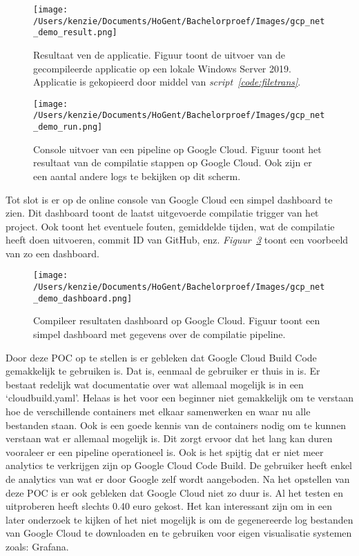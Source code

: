 \begin{figure}[!htbp]
    \centering
    \texttt{[image: /Users/kenzie/Documents/HoGent/Bachelorproef/Images/gcp\_net\_demo\_result.png]}
    \caption{Resultaat ven de applicatie. Figuur toont de uitvoer van de gecompileerde applicatie op een lokale Windows Server 2019. Applicatie is gekopieerd door middel van \emph{script~\ref{code:filetrans}}.}
    \label{fig:GCP_POC_result}
\end{figure}

\begin{figure}[!htbp]
    \centering
    \texttt{[image: /Users/kenzie/Documents/HoGent/Bachelorproef/Images/gcp\_net\_demo\_run.png]}
    \caption{Console uitvoer van een pipeline op Google Cloud. Figuur toont het resultaat van de compilatie stappen op Google Cloud. Ook zijn er een aantal andere logs te bekijken op dit scherm.}
    \label{fig:GCP_POC_run}
\end{figure}

Tot slot is er op de online console van Google Cloud een simpel dashboard te zien. Dit dashboard toont de laatst uitgevoerde compilatie trigger van het project. Ook toont het eventuele fouten, gemiddelde tijden, wat de compilatie heeft doen uitvoeren, commit ID van GitHub, enz. \emph{Figuur~\ref{fig:GCP_POC_dashboard}} toont een voorbeeld van zo een dashboard.

\begin{figure}[!htbp]
    \centering
    \texttt{[image: /Users/kenzie/Documents/HoGent/Bachelorproef/Images/gcp\_net\_demo\_dashboard.png]}
    \caption{Compileer resultaten dashboard op Google Cloud. Figuur toont een simpel dashboard met gegevens over de compilatie pipeline.}
    \label{fig:GCP_POC_dashboard}
\end{figure}

Door deze POC op te stellen is er gebleken dat Google Cloud Build Code gemakkelijk te gebruiken is. Dat is, eenmaal de gebruiker er thuis in is. Er bestaat redelijk wat documentatie over wat allemaal mogelijk is in een ‘cloudbuild.yaml’. Helaas is het voor een beginner niet gemakkelijk om te verstaan hoe de verschillende containers met elkaar samenwerken en waar nu alle bestanden staan. Ook is een goede kennis van de containers nodig om te kunnen verstaan wat er allemaal mogelijk is. Dit zorgt ervoor dat het lang kan duren vooraleer er een pipeline operationeel is. Ook is het spijtig dat er niet meer analytics te verkrijgen zijn op Google Cloud Code Build. De gebruiker heeft enkel de analytics van wat er door Google zelf wordt aangeboden. Na het opstellen van deze POC is er ook gebleken dat Google Cloud niet zo duur is. Al het testen en uitproberen heeft slechts 0.40 euro gekost.
Het kan interessant zijn om in een later onderzoek te kijken of het niet mogelijk is om de gegenereerde log bestanden van Google Cloud te downloaden en te gebruiken voor eigen visualisatie systemen zoals: Grafana. 

